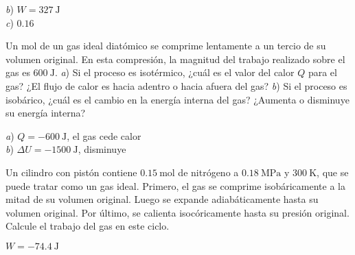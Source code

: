 \begin{Answer}
	\begin{minipage}[t]{.4\textwidth}
    \textit{b}) $W = \SI{327}{\joule}$\\ \textit{c}) $0.16$
  \end{minipage}
\end{Answer}
%
\begin{Exercise}
  Un mol de un gas ideal diatómico se comprime lentamente a un tercio de su volumen original. En esta compresión, la magnitud del trabajo realizado sobre el gas es $\SI{600}{\joule}$. \textit{a}) Si el proceso es isotérmico, ¿cuál es el valor del calor $Q$ para el gas? ¿El flujo de calor es hacia adentro o hacia afuera del gas? \textit{b}) Si el proceso es isobárico, ¿cuál es el cambio en la energía interna del gas? ¿Aumenta o disminuye su energía interna?
\end{Exercise}
\begin{Answer}
	\begin{minipage}[t]{.4\textwidth}
    \textit{a}) $Q = \SI{-600}{\joule}$, el gas cede calor\\ \textit{b}) $\Delta U = \SI{-1500}{\joule}$, disminuye
  \end{minipage}
\end{Answer}
%
\begin{Exercise}
  Un cilindro con pistón contiene $\SI{0.15}{\mole}$ de nitrógeno a $\SI{0.18}{\mega\pascal}$ y $\SI{300}{\kelvin}$, que se puede tratar como un gas ideal. Primero, el gas se comprime isobáricamente a la mitad de su volumen original. Luego se expande adiabáticamente hasta su volumen original. Por último, se calienta isocóricamente hasta su presión original. Calcule el trabajo del gas en este ciclo.
\end{Exercise}
\begin{Answer}
	\begin{minipage}[t]{.4\textwidth}
    $W = \SI{-74.4}{\joule}$
  \end{minipage}
\end{Answer}
%
